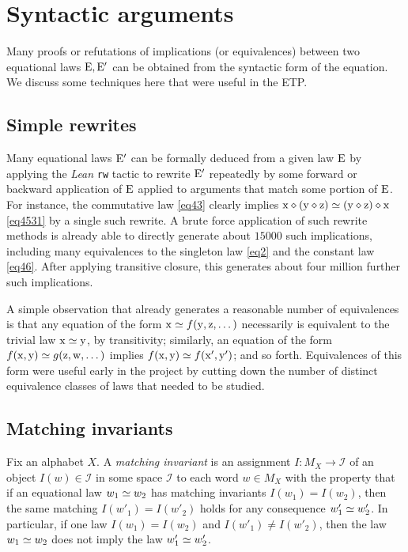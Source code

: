 
\section{Syntactic arguments}\label{syntactic-sec}

Many proofs or refutations of implications (or equivalences) between two equational laws $\mathrm{E},\mathrm{E}'$ can be obtained from the syntactic form of the equation.  We discuss some techniques here that were useful in the ETP.

\subsection{Simple rewrites}\label{rewrite-sec}

Many equational laws $\mathrm{E}'$ can be formally deduced from a given law $\mathrm{E}$ by applying the \emph{Lean} \texttt{rw} tactic to rewrite $\mathrm{E}'$ repeatedly by some forward or backward application of $\mathrm{E}$ applied to arguments that match some portion of $\mathrm{E}$.  For instance, the commutative law \eqref{eq43} clearly implies $\mathrm{x} \diamond (\mathrm{y} \diamond \mathrm{z}) \simeq (\mathrm{y} \diamond \mathrm{z}) \diamond \mathrm{x}$ \eqref{eq4531}
by a single such rewrite.  A brute force application of such rewrite methods is already able to directly generate about $\num{15000}$ such implications, including many equivalences to the singleton law \eqref{eq2} and the constant law \eqref{eq46}.  After applying transitive closure, this generates about four million further such implications.

A simple observation that already generates a reasonable number of equivalences is that any equation of the form $\mathrm{x} \simeq f(\mathrm{y},\mathrm{z},\dots)$ necessarily is equivalent to the trivial law $\mathrm{x} \simeq \mathrm{y}$, by transitivity; similarly, an equation of the form $f(\mathrm{x},\mathrm{y}) \simeq g(\mathrm{z},\mathrm{w},\dots)$ implies $f(\mathrm{x},\mathrm{y}) \simeq f(\mathrm{x}',\mathrm{y}')$; and so forth.  Equivalences of this form were useful early in the project by cutting down the number of distinct equivalence classes of laws that needed to be studied.

\subsection{Matching invariants}

Fix an alphabet $X$. A \emph{matching invariant} is an assignment $I \colon M_X \to {\mathcal I}$ of an object $I(w) \in {\mathcal I}$ in some space ${\mathcal I}$ to each word $w \in M_X$ with the property that if an equational law $w_1 \simeq w_2$ has matching invariants $I(w_1)=I(w_2)$, then the same matching $I(w'_1) = I(w'_2)$ holds for any consequence $w'_1 \simeq w'_2$.  In particular, if one law $I(w_1)=I(w_2)$ and $I(w'_1) \neq I(w'_2)$, then the law $w_1 \simeq w_2$ does not imply the law $w'_1 \simeq w'_2$.

